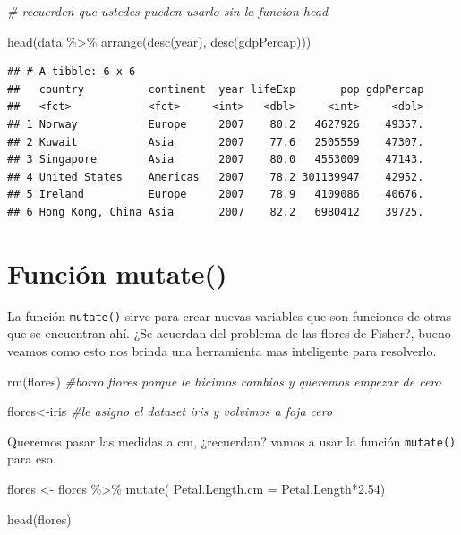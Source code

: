 \documentclass[
]{book}
\newenvironment{Shaded}{\begin{snugshade}}{\end{snugshade}}
\newcommand{\AttributeTok}[1]{\textcolor[rgb]{0.77,0.63,0.00}{#1}}
\newcommand{\CommentTok}[1]{\textcolor[rgb]{0.56,0.35,0.01}{\textit{#1}}}
\newcommand{\FloatTok}[1]{\textcolor[rgb]{0.00,0.00,0.81}{#1}}
\newcommand{\FunctionTok}[1]{\textcolor[rgb]{0.00,0.00,0.00}{#1}}
\newcommand{\NormalTok}[1]{#1}
\newcommand{\OtherTok}[1]{\textcolor[rgb]{0.56,0.35,0.01}{#1}}
\newcommand{\SpecialCharTok}[1]{\textcolor[rgb]{0.00,0.00,0.00}{#1}}
\begin{document}
\begin{Shaded}
\begin{Highlighting}[]
\CommentTok{\# recuerden que ustedes pueden usarlo sin la funcion head }

\FunctionTok{head}\NormalTok{(data }\SpecialCharTok{\%\textgreater{}\%} \FunctionTok{arrange}\NormalTok{(}\FunctionTok{desc}\NormalTok{(year), }\FunctionTok{desc}\NormalTok{(gdpPercap)))}
\end{Highlighting}
\end{Shaded}

\begin{verbatim}
## # A tibble: 6 x 6
##   country          continent  year lifeExp       pop gdpPercap
##   <fct>            <fct>     <int>   <dbl>     <int>     <dbl>
## 1 Norway           Europe     2007    80.2   4627926    49357.
## 2 Kuwait           Asia       2007    77.6   2505559    47307.
## 3 Singapore        Asia       2007    80.0   4553009    47143.
## 4 United States    Americas   2007    78.2 301139947    42952.
## 5 Ireland          Europe     2007    78.9   4109086    40676.
## 6 Hong Kong, China Asia       2007    82.2   6980412    39725.
\end{verbatim}

\hypertarget{funciuxf3n-mutate}{%
\section{Función mutate()}\label{funciuxf3n-mutate}}

La función \texttt{mutate()} sirve para crear nuevas variables que son funciones de otras que se encuentran ahí. ¿Se acuerdan del problema de las flores de Fisher?, bueno veamos como esto nos brinda una herramienta mas inteligente para resolverlo.

\begin{Shaded}
\begin{Highlighting}[]
\FunctionTok{rm}\NormalTok{(flores) }\CommentTok{\#borro flores porque le hicimos cambios y queremos empezar de cero}

\NormalTok{flores}\OtherTok{\textless{}{-}}\NormalTok{iris }\CommentTok{\#le asigno el dataset iris y volvimos a foja cero}
\end{Highlighting}
\end{Shaded}

Queremos pasar las medidas a cm, ¿recuerdan? vamos a usar la función \texttt{mutate()} para eso.

\begin{Shaded}
\begin{Highlighting}[]
\NormalTok{flores }\OtherTok{\textless{}{-}}\NormalTok{ flores }\SpecialCharTok{\%\textgreater{}\%} \FunctionTok{mutate}\NormalTok{( }\AttributeTok{Petal.Length.cm =}\NormalTok{ Petal.Length}\SpecialCharTok{*}\FloatTok{2.54}\NormalTok{)}

\FunctionTok{head}\NormalTok{(flores)}
\end{Highlighting}
\end{Shaded}
\end{document}
